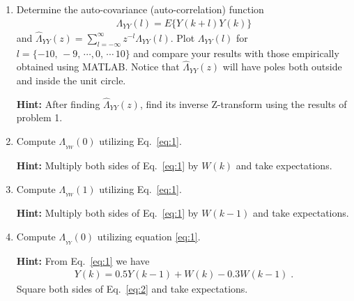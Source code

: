 \begin{enumerate}

\item
Determine the auto-covariance (auto-correlation) function
\begin{align*}
    \Lambda_{YY}(l) = E\{Y(k+l)Y(k)\}
\end{align*}
and $\hat{\Lambda}_{YY}(z) = \sum_{l=-\infty}^{\infty} z^{-l} \Lambda_{YY}(l)$. Plot $\Lambda_{YY}(l)$ for $l = \{-10,\, -9,\, \cdots ,0,\, \cdots \,10\}$ and compare your results with those empirically obtained using MATLAB. Notice that $\hat{\Lambda}_{YY}(z)$ will have poles both outside and inside the unit circle.

\textbf{Hint:} After finding $\hat{\Lambda}_{YY}(z)$, find its inverse Z-transform using the results of problem 1.

\item
Compute $\Lambda_{_{YW}}(0)$ utilizing Eq.~\eqref{eq:1}.

\textbf{Hint:} Multiply both sides of Eq.~\eqref{eq:1} by $W(k)$ and take expectations.

\item
Compute $\Lambda_{_{YW}}(1)$ utilizing Eq.~\eqref{eq:1}.

\textbf{Hint:} Multiply both sides of Eq.~\eqref{eq:1} by $W(k-1)$ and take expectations.


\item
Compute $\Lambda_{_{YY}}(0)$ utilizing equation \eqref{eq:1}.

\textbf{Hint:} From Eq.~\eqref{eq:1} we have
\begin{align}
    \label{eq:2}
    Y(k) =  0.5 Y(k-1)+ W(k) - 0.3 W(k-1) \; .
\end{align}
Square both sides of Eq.~\eqref{eq:2} and take expectations.

\end{enumerate}



